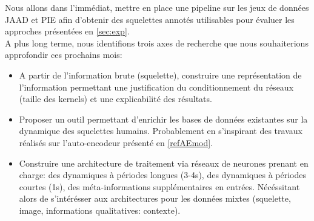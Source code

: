 Nous allons dans l’immédiat, mettre en place une pipeline sur les jeux de données JAAD et PIE afin d'obtenir des squelettes annotés utilisables pour évaluer les approches présentées en \ref{sec:exp}.\\

A plus long terme, nous identifions trois axes de recherche que nous souhaiterions approfondir ces prochains mois:
\begin{itemize}
    \item A partir de l'information brute (squelette), construire une représentation de l'information permettant une justification du conditionnement du réseaux (taille des kernels) et une explicabilité des résultats.
    \item Proposer un outil permettant d'enrichir les bases de données existantes sur la dynamique des squelettes humains. Probablement en s'inspirant des travaux réalisés sur l'auto-encodeur présenté en \ref{refAEmod}.
    \item Construire une architecture de traitement via réseaux de neurones prenant en charge: des dynamiques à périodes longues (3-4s), des dynamiques à périodes courtes (1s), des méta-informations supplémentaires en entrées. Nécéssitant alors de s'intérésser aux architectures pour les données mixtes (squelette, image, informations qualitatives: contexte).
\end{itemize}



